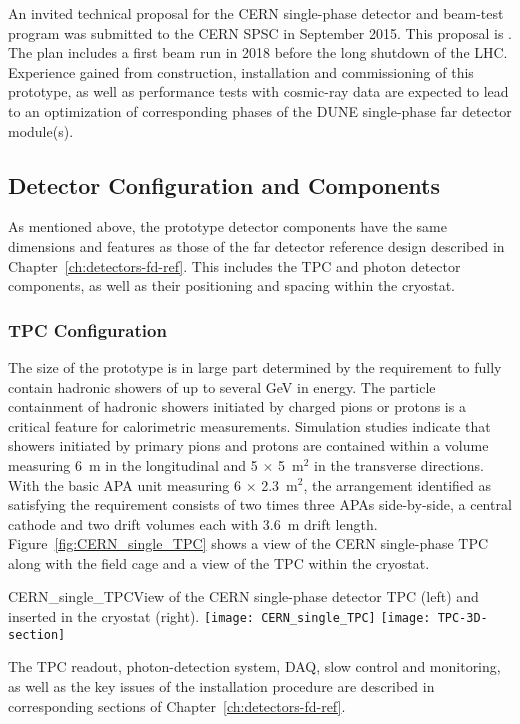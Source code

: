 An invited technical proposal for the CERN single-phase detector and
beam-test program
was submitted
to the CERN SPSC in September 2015. This proposal is \anxcernproto. The plan includes a first beam run in
2018 before the long shutdown of the LHC. Experience gained from
construction, installation and commissioning of this prototype, as
well as performance tests with cosmic-ray data are expected to lead to
an optimization of corresponding phases of the DUNE single-phase far
detector module(s).

\subsection{Detector Configuration and Components}

As mentioned above, the prototype detector components have 
the same dimensions and features as those of the far detector reference design described in
Chapter~\ref{ch:detectors-fd-ref}. This includes the TPC and photon
detector components, as well as their positioning and spacing within
the cryostat.


\subsubsection{TPC Configuration}

The size of the prototype is in large part determined by the
requirement to fully contain hadronic showers of up to several GeV in
energy.  The particle containment of hadronic showers initiated by
charged pions or protons is a critical feature for calorimetric
measurements. Simulation studies indicate that showers initiated by
 primary pions and protons are contained within a volume
measuring 6~m in the longitudinal and 5 $\times$ 5~m$^2$ in the
transverse directions. With the basic APA unit measuring
6 $\times$ 2.3~m$^2$, the arrangement identified as satisfying the
requirement consists of two times three APAs side-by-side, a central
cathode and two drift volumes each with 3.6~m drift
length. Figure~\ref{fig:CERN_single_TPC} shows a view of the CERN
single-phase TPC along with the field cage and a view of the TPC
within the cryostat.
\begin{cdrfigure}{CERN_single_TPC}{View of the CERN single-phase detector TPC (left) and inserted in the cryostat (right). }
\texttt{[image: CERN\_single\_TPC]}
\texttt{[image: TPC-3D-section]}
\end{cdrfigure}
The TPC readout, photon-detection system, DAQ, slow control and
monitoring, as well as the key issues of the installation procedure
are described in corresponding sections of
Chapter~\ref{ch:detectors-fd-ref}.

